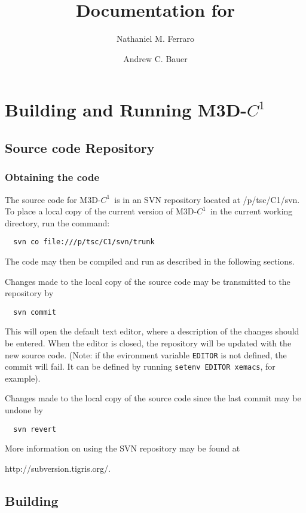 \documentclass[letterpaper]{book}
\title{Documentation for \codename}
\author{Nathaniel M. Ferraro \and Andrew C. Bauer}
\newcommand{\codename}{M3D-$C^1$}
\newcommand{\repositoryloc}{/p/tsc/C1/svn}
\newcommand{\svnurl}{http://subversion.tigris.org/}
\begin{document}
\maketitle

\tableofcontents


\chapter{Building and Running \codename}

\section{Source code Repository}

\subsection{Obtaining the code}

The source code for \codename\ is in an SVN repository located at
\repositoryloc.  To place a local copy of the current version of
\codename\ in the current working directory, run the command:
\begin{verbatim}
  svn co file:///p/tsc/C1/svn/trunk
\end{verbatim}
The code may then be compiled and run as described in the following
sections.

Changes made to the local copy of the source code may be transmitted to
the repository by
\begin{verbatim}
  svn commit
\end{verbatim}
This will open the default text editor, where a description of the
changes should be entered.  When the editor is closed, the repository
will be updated with the new source code.  (Note: if the evironment
variable \texttt{EDITOR} is not defined, the commit will fail.  It can
be defined by running \texttt{setenv EDITOR xemacs}, for example).

Changes made to the local copy of the source code since the last
commit may be undone by
\begin{verbatim}
  svn revert
\end{verbatim}

More information on using the SVN repository may be found at

\svnurl.





\section{Building}
\end{document}
